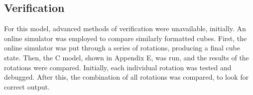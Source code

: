 \documentclass{article}
\begin{document}
\vspace{0.2cm}


\subsection {Verification}

For this model, advanced methods of verification were unavailable, initially. An online simulator was employed to compare similarly formatted cubes. First, the online simulator was put through a series of rotations, producing a final cube state. Then, the C model, shown in Appendix E, was run, and the results of the rotations were compared. Initially, each individual rotation was tested and debugged. After this, the combination of all rotations was compared, to look for correct output.\\
\end{document}
